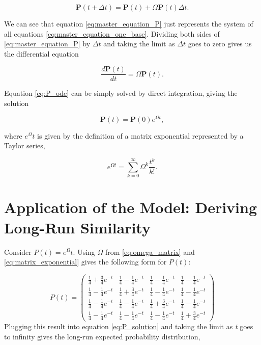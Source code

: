 \documentclass{article}
\begin{document}
		\begin{equation}
			\mathbf{P}(t+\Delta t) = \mathbf{P}(t) + \Omega\mathbf{P}(t)\Delta t.
			\label{eq:master_equation_P}
		\end{equation}
		
		We can see that equation \eqref{eq:master_equation_P} just represents the system of all equations \eqref{eq:master_equation_one_base}. Dividing both sides of \eqref{eq:master_equation_P} by $\Delta t$ and taking the limit as $\Delta t$ goes to zero gives us the differential equation
		
		\begin{equation}
			\frac{d\mathbf{P}(t)}{dt} = \Omega\mathbf{P}(t).
			\label{eq:P_ode}
		\end{equation}
		
		Equation \eqref{eq:P_ode} can be simply solved by direct integration, giving the solution
		
		\begin{equation}
			\mathbf{P}(t) = \mathbf{P}(0)e^{\Omega t},
			\label{eq:P_solution}
		\end{equation}
		
		where $e^\Omega t$ is given by the definition of a matrix exponential represented by a Taylor series,
		
		\begin{equation}
			e^{\Omega t} = \sum_{k=0}^{\infty}\Omega^k\frac{t^k}{k!}.
			\label{eq:matrix_exponential}
		\end{equation}
		
	\section{Application of the Model: Deriving Long-Run Similarity}
		
		Consider $P(t) = e^\Omega t$. Using $\Omega$ from \eqref{eq:omega_matrix} and \eqref{eq:matrix_exponential} gives the following form for $P(t)$:
		
		\begin{equation}
			P(t) = \begin{pmatrix}
				\frac{1}{4} + \frac{3}{4}e^{-t} & \frac{1}{4} - \frac{1}{4}e^{-t} & \frac{1}{4} - \frac{1}{4}e^{-t} & \frac{1}{4} - \frac{1}{4}e^{-t} \\
				\frac{1}{4} - \frac{1}{4}e^{-t} & \frac{1}{4} + \frac{3}{4}e^{-t} & \frac{1}{4} - \frac{1}{4}e^{-t} & \frac{1}{4} - \frac{1}{4}e^{-t} \\
				\frac{1}{4} - \frac{1}{4}e^{-t} & \frac{1}{4} - \frac{1}{4}e^{-t} & \frac{1}{4} + \frac{3}{4}e^{-t} & \frac{1}{4} - \frac{1}{4}e^{-t} \\
				\frac{1}{4} - \frac{1}{4}e^{-t} & \frac{1}{4} - \frac{1}{4}e^{-t} & \frac{1}{4} - \frac{1}{4}e^{-t} & \frac{1}{4} + \frac{3}{4}e^{-t}
			\end{pmatrix}
			\label{eq:P_application}
		\end{equation}
		Plugging this result into equation \eqref{eq:P_solution} and taking the limit as \textit{t} goes to infinity gives the long-run expected probability distribution,
		
\end{document}
